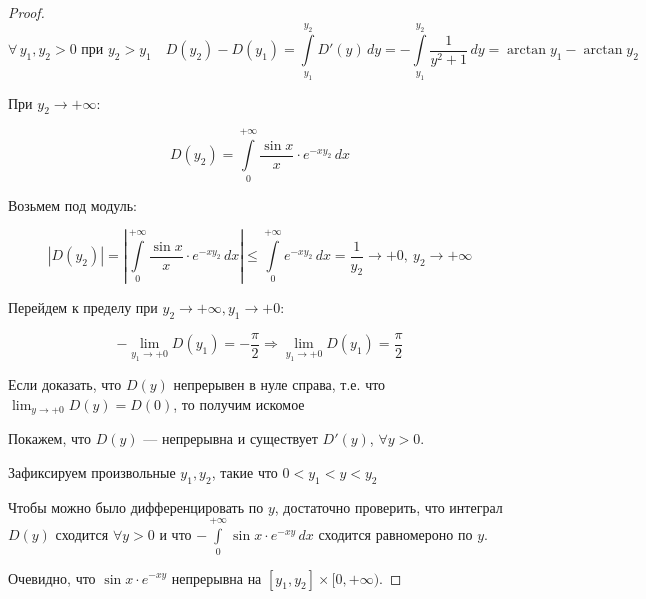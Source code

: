 \begin{proof}
\[
\forall\, y_1, y_2 > 0 \text{ при } y_2 > y_1 \quad
D(y_2) - D(y_1) = \int\limits_{y_1}^{y_2} D'(y) \, dy
= - \int\limits_{y_1}^{y_2} \frac{1}{y^2 + 1} \, dy = \arctan{y_1} - \arctan{y_2}
\]

\noindent При $y_2 \to +\infty$:

\[
D(y_2) = \int\limits_0^{+\infty} \frac{\sin x}{x} \cdot e^{-x y_2} \, dx
\]

Возьмем под модуль:

\[
\left| D(y_2) \right|
= \left| \int\limits_0^{+\infty} \frac{\sin x}{x} \cdot e^{-x y_2} \, dx \right|
\leq \int\limits_0^{+\infty} e^{-x y_2} \, dx
= \frac{1}{y_2} \longrightarrow +0, \  y_2 \to +\infty
\]



\noindent Перейдем к пределу при $y_2 \rightarrow + \infty,  y_1 \rightarrow +0$:

\[
- \lim_{y_1 \to +0} D(y_1) = -\frac{\pi}{2} \Rightarrow \lim_{y_1 \to +0} D(y_1) = \frac{\pi}{2}
\]

\begin{note}
Если доказать, что $D(y)$ непрерывен в нуле справа, т.е. что $\lim_{y \to +0} D(y) = D(0)$, то получим искомое
\end{note}

\noindent Покажем, что \( D(y) \) — непрерывна и существует \( D'(y) \), \( \forall y > 0 \).

\noindent Зафиксируем произвольные \( y_1, y_2 \), такие что \( 0 < y_1 < y < y_2 \)

\begin{center}
\end{center}


\begin{note}
Чтобы можно было дифференцировать по $y$, достаточно проверить, что интеграл $D(y)$ сходится $\forall y > 0$ и что $- \int\limits_0^{+\infty} \sin x \cdot e^{-x y} \, dx$ сходится равномероно по $y$.
\end{note}

\noindent Очевидно, что $ \sin x \cdot e^{-x y}$ непрерывна на $[y_1, y_2] \times [0, +\infty)$.


\end{proof}
